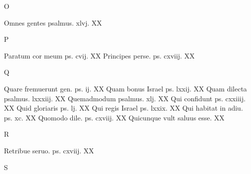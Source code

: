 \documentclass[a5paper,10pt]{book}
\begin{document}
\begin{multicols}{2}
\newline \vspace{-1.75em}
\begin{center}
\color{red} O
\end{center}
\vspace{-.75em}
\par \noindent Omnes gentes psalmus. xlvj. \hfill XX
\newline \vspace{-1.75em}
\begin{center}
\color{red} P
\end{center}
\vspace{-.75em}
\par \noindent Paratum cor meum ps. cvij. \hfill XX
\newline Principes perse. ps. cxviij. \hfill XX
\newline \vspace{-1.75em}
\begin{center}
\color{red} Q
\end{center}
\vspace{-.75em}
\par \noindent Quare fremuerunt gen. ps. ij. \hfill XX
\newline Quam bonus Israel ps. lxxij. \hfill XX
\newline Quam dilecta psalmus. lxxxiij. \hfill XX
\newline Quemadmodum psalmus. xlj. \hfill XX
\newline Qui confidunt ps. cxxiiij. \hfill XX
\newline Quid gloriaris ps. lj. \hfill XX
\newline Qui regis Israel ps. lxxix. \hfill XX
\newline Qui habitat in adiu. ps. xc. \hfill XX
\newline Quomodo dile. ps. cxviij. \hfill XX
\newline Quicunque vult saluus esse. \hfill XX
\newline \vspace{-1.75em}
\begin{center}
\color{red} R
\end{center}
\vspace{-.75em}
\par \noindent Retribue seruo. ps. cxviij. \hfill XX
\newline \vspace{-1.75em}
\begin{center}
\color{red} S
\end{center}

\end{multicols}
\end{document}

